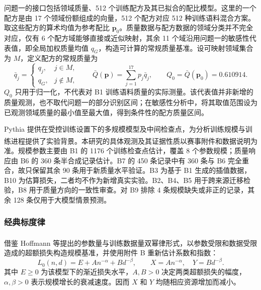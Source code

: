 \documentclass[bwprint]{gmcmthesis}
\begin{document}
        问题一的接口包括领域质量、512 个训练配方及其已拟合的配比模型。这里的一个配方是由 17 个领域份额组成的向量，512 个配方对应 512 种训练语料混合方案。取这些配方的算术均值为参考配比 $\bm p_0$。质量数据与配方数据的领域分类并不完全对应，仅有 6 个配方域能够直接或近似映射，其余 11 个域沿用问题一的敏感性代表值，即全局加权质量均值 $q_G$，构造可计算的常规质量基准。设可映射领域集合为 $M$，定义配方的常规质量为
        \begin{equation}
         \bar q_j=\begin{cases}q_j,&j\in M,\\q_G,&j\notin M,\end{cases}
         \qquad \bar Q(\bm p)=\sum_{j=1}^{17}p_j\bar q_j,
         \qquad Q_0=\bar Q(\bm p_0)=0.610914.
         \label{eq:p2_quality}
        \end{equation}
        $Q_0$ 只用于归一化，不代表对 B1 训练语料质量的实际测量。该代表值并非新增的质量观测，也不取代问题一的部分识别区间；在敏感性分析中，将其取值范围设为已观测领域质量的最小值至最大值，得到条件性的配方质量区间。
        
        Pythia 提供在受控训练设置下的多规模模型及中间检查点，为分析训练规模与训练进程提供了实验背景\textsuperscript{\cite{biderman2023pythia}}。本研究的具体观测及其证据性质以赛事附件和数据说明为准。规模参数主要由 B1 的 1176 个训练检查点估计，覆盖 8 个参数规模；质量响应由 B6 的 360 条半合成记录估计。B7 的 450 条记录中有 360 条与 B6 完全重合，故只保留其余 90 条用于新质量水平验证。B3 为基于 B1 生成的插值数据，B10 为估算损失，二者均不作为新增真实实验。B2、B4、B5 用于跨来源迁移检验，B8 用于质量方向的一致性审查。对 B9 排除 4 条规模缺失或非正的记录，其余 128 条仅用于大模型情景预测。
    
        \subsubsection{经典标度律}  %
        借鉴 Hoffmann 等提出的参数量与训练数据量双幂律形式\textsuperscript{\cite{hoffmann2022chinchilla}}，以参数受限和数据受限造成的超额损失构造规模基准，并使用附件 B 重新估计系数和指数：
        \begin{equation}
         L_0(n,d)=E+A n^{-\alpha}+B d^{-\beta},\qquad
         X=A n^{-\alpha},\quad Y=B d^{-\beta}.
         \label{eq:p2_baseline}
        \end{equation}
        其中 $E\geq0$ 为该模型下的渐近损失水平，$A,B>0$ 决定两类超额损失的幅度，$\alpha,\beta>0$ 表示规模增长的衰减速度。因而 $X$ 和 $Y$ 均随相应资源增加而减小。
        
\end{document}
